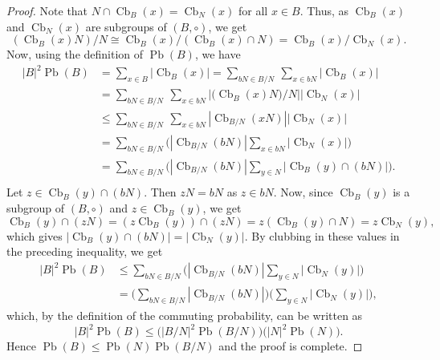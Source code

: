 \documentclass[oneside]{amsart}
\numberwithin{equation}{section}
\theoremstyle{plain}
\theoremstyle{definition}
\newcommand{\Cb}{\operatorname{Cb} }
\newcommand{\Pb}{\operatorname{Pb} }
\begin{document}
\begin{proof}
Note that $N \cap \Cb_B(x) = \Cb_N(x)$ for all $x \in B$. Thus, as $\Cb_B(x)$ and  $\Cb_N(x)$ are subgroups of $(B, \circ)$, we get
$$(\Cb_B(x)  N)/N \cong \Cb_B(x)/(\Cb_B(x) \cap N) = \Cb_B(x)/\Cb_N(x).$$
Now, using the definition of $\Pb(B)$, we have
\begin{align*}
  |B|^2\Pb(B) &=\sum_{x\in B}|\Cb_{B}(x)| =\sum_{b N\in{B/N}} ~ \sum_{x\in b N}|\Cb_{B}(x)|\\
             &=\sum_{ b N\in{B/N}} ~ \sum_{x\in b N}|{(\Cb_{B}(x) N})/N||\Cb_N(x)|\\
             &\leqslant \sum_{b N\in{B/N}} ~ \sum_{x \in bN}|\Cb_{B/N}(x N)| |\Cb_N(x)|\\  
             &= \sum_{b N\in{B/N}}\Big(|\Cb_{B/N}(b N)|\sum_{x\in b N}|\Cb_N(x)|\Big)\\   
             &= \sum_{b N\in{B/N}}\Big(|\Cb_{B/N}(b N)|  \sum_{y\in N}|\Cb_{B}(y)\cap (b N)|\Big).\\                      
      \end{align*}
      Let $z \in   \Cb_B(y) \cap (b N)$.  Then $z N = b N$ as $z \in b  N$. Now, since $\Cb_{B}(y)$ is a subgroup of $(B, \circ)$ and $z \in \Cb_B(y)$, we get
      $$\Cb_{B}(y)\cap (z N) = (z \Cb_{B}(y)) \cap (z N) = z (\Cb_{B}(y)\cap N) = z   \Cb_N(y),$$
     which gives $|\Cb_{B}(y)\cap(b N)| = |\Cb_N(y)|$. By clubbing in these values in the preceding inequality, we get 
    \begin{align*}
        |B|^2\Pb(B) &\leqslant \sum_{bN\in B/N} \Big(|\Cb_{B/N}(b  N)| \sum_{y\in N}|\Cb_{N}(y)|\Big)\\
        &= \Big(\sum_{bN\in B/N} |\Cb_{B/N}(b  N)| \Big) \Big(\sum_{y\in N}|\Cb_{N}(y)|\Big),
    \end{align*}
      which, by the definition of the commuting probability,  can be written as
     $$|B|^2\Pb(B)\leqslant \big(|B/N|^2\Pb(B/N)\big)\big(|N|^2\Pb(N)\big).$$   
     Hence   $\Pb(B)\leqslant \Pb(N)\Pb(B/N)$ and the proof is complete. 
\end{proof}
\end{document}
